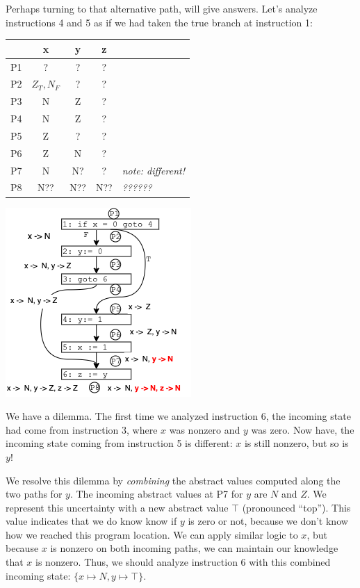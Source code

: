 \documentclass[11pt]{article}
\begin{document}
Perhaps turning to that alternative path, will give answers.  
Let's analyze instructions 4 and 5 as if we had taken the
true branch at instruction 1:

\tablespace
\begin{center}
\begin{minipage}[t][-9.7em][b]{0.5\textwidth} %
\begin{tabular}{r | c c c l}
  & x & y & z \\
\hline
P1 & ? & ?   & ?  \\
P2 & $Z_T,N_F$ & ?  & ?  \\
P3 & N & Z & ?  \\
P4 & N & Z & ?  \\
P5 & Z & ? & ?  \\
P6 & Z & N & ? &   \\
P7 & N & N? & ? & \textit{note: different!} \\
P8 & N?? & N?? & N?? & \textit{??????} \\
\end{tabular}
\end{minipage}
\hspace*{1em}%
\includegraphics[scale=0.8]{images/alternativepathwrong}
\end{center}
\tablespace

We have a dilemma.  The first time we analyzed instruction 6, the incoming state
had come from instruction 3, where $x$ was nonzero and $y$ was zero.  Now have,
the incoming state coming from instruction 5 is different:  $x$ is still nonzero,
but so is $y$!

We resolve this dilemma by \emph{combining} the abstract values computed along the two
paths for $y$. The incoming abstract values at P7 for $y$ are $N$
and $Z$.    We represent this uncertainty
with a new abstract
value $\top$ (pronounced ``top'').  This value indicates that we do know know if $y$ is zero or not,
because we don't know how we reached this program location. 
We can apply similar logic to $x$, but because $x$ is
nonzero on both incoming paths, we can maintain our knowledge that $x$ is
nonzero.  Thus, we should analyze instruction 6 with this combined
incoming state:  $\{x \mapsto N, y \mapsto {\top}\}$.  
\end{document}
